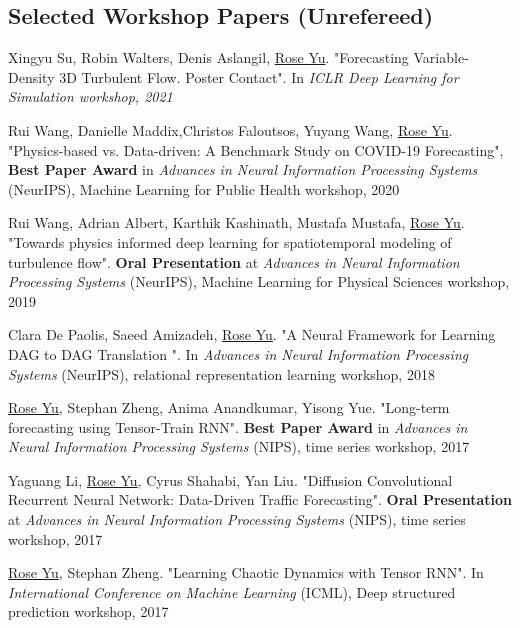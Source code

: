 \documentclass[margin,line]{res}
\begin{document}
\begin{resume}
 
\section{\sc Selected
Workshop
Papers
(Unrefereed) }
\begin{enumerate}[label={[W\arabic*]}]
\item Xingyu Su,  Robin Walters,  Denis Aslangil, \underline{Rose Yu}.
"Forecasting Variable-Density 3D Turbulent Flow. Poster Contact".  In \textit{ICLR Deep Learning for Simulation workshop, 2021}

\item Rui Wang, Danielle Maddix,Christos Faloutsos, Yuyang Wang, \underline{Rose Yu}. "Physics-based vs. Data-driven: A Benchmark Study on COVID-19 Forecasting",  \textbf{Best Paper Award}  in \textit{Advances in Neural Information Processing Systems} (NeurIPS), Machine Learning for Public Health workshop, 2020



\item Rui Wang, Adrian Albert, Karthik Kashinath, Mustafa Mustafa, \underline{Rose Yu}. "Towards physics informed deep learning for spatiotemporal modeling of turbulence flow". \textbf{Oral Presentation} at \textit{Advances in Neural Information Processing Systems} (NeurIPS), Machine Learning for Physical Sciences  workshop, 2019

\item Clara De Paolis, Saeed Amizadeh, \underline{Rose Yu}.  "A Neural Framework for Learning DAG to DAG Translation ". In  \textit{Advances in Neural Information Processing Systems} (NeurIPS), relational representation learning workshop, 2018

\item \underline{Rose Yu}, Stephan Zheng, Anima Anandkumar, Yisong Yue. "Long-term forecasting using Tensor-Train RNN". \textbf{Best Paper Award}  in \textit{Advances in Neural Information Processing Systems} (NIPS), time series workshop, 2017


\item Yaguang Li, \underline{Rose Yu}, Cyrus Shahabi, Yan Liu. "Diffusion Convolutional Recurrent Neural Network: Data-Driven Traffic Forecasting". \textbf{Oral Presentation} at \textit{Advances in Neural Information Processing Systems} (NIPS), time series workshop, 2017


\item \underline{Rose Yu}, Stephan Zheng. "Learning Chaotic Dynamics with Tensor RNN". In  \textit{International Conference on Machine Learning} (ICML), Deep structured prediction workshop, 2017


\end{enumerate}
\end{resume}
\end{document}
